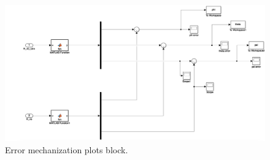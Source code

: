 \documentclass{article}
\begin{document}
\begin{figure}
    \centering
    \includegraphics[angle=90,scale = 0.5]{plot_error_mechanization.png}
    \caption{Error mechanization plots block.}
    \label{fig:f8}
\end{figure}
\end{document}

